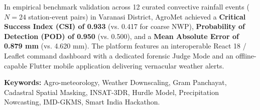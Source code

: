 \documentclass[11pt,a4paper,oneside]{report}
\begin{document}
\noindent In empirical benchmark validation across 12 curated convective rainfall events ($N=24$ station-event pairs) in Varanasi District, AgroMet achieved a \textbf{Critical Success Index (CSI) of 0.933} (vs. 0.417 for coarse NWP), \textbf{Probability of Detection (POD) of 0.950} (vs. 0.500), and a \textbf{Mean Absolute Error of 0.879 mm} (vs. 4.620 mm). The platform features an interoperable React 18 / Leaflet command dashboard with a dedicated forensic Judge Mode and an offline-capable Flutter mobile application delivering vernacular weather alerts.

\vspace{0.4cm}
\noindent \textbf{Keywords:} Agro-meteorology, Weather Downscaling, Gram Panchayat, Cadastral Spatial Masking, INSAT-3DR, Hurdle Model, Precipitation Nowcasting, IMD-GKMS, Smart India Hackathon.

\newpage
\tableofcontents

\newpage
\listoffigures

\newpage
\listoftables

\newpage
\thispagestyle{plain}
\end{document}
